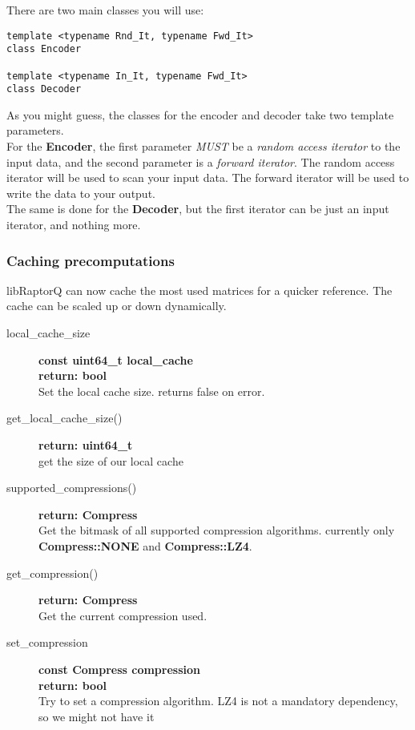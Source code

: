 \documentclass[11pt,a4paper]{refart}
\begin{document}
\newpage

There are two main classes you will use:
\begin{verbatim}
template <typename Rnd_It, typename Fwd_It>
class Encoder

template <typename In_It, typename Fwd_It>
class Decoder
\end{verbatim}

As you might guess, the classes for the encoder and decoder take two template parameters.\\
For the \textbf{Encoder}, the first parameter \textit{MUST} be a \textit{random access iterator} to the input data, and the second parameter is a
\textit{forward iterator}. The random access iterator will be used to scan your input data. The forward iterator will be used to write the data to your output.\\
The same is done for the \textbf{Decoder}, but the first iterator can be just an input iterator, 
and nothing more.

\subsubsection{Caching precomputations}
libRaptorQ can now cache the most used matrices for a quicker reference. The cache can be scaled up or down dynamically.

\begin{description}

\item[local\_cache\_size] \textbf{const uint64\_t local\_cache}\\
\textbf{return: bool}\\
Set the local cache size. returns false on error.

\item[get\_local\_cache\_size()] \textbf{return: uint64\_t}\\
get the size of our local cache

\item[supported\_compressions()] \textbf{return: Compress} \\
Get the bitmask of all supported compression algorithms. currently only \textbf{Compress::NONE} and \textbf{Compress::LZ4}.

\item[get\_compression()] \textbf{return: Compress} \\
Get the current compression used.

\item [set\_compression] \textbf{const Compress compression} \\
\textbf{return: bool}\\
Try to set a compression algorithm. LZ4 is not a mandatory dependency, so we might not have it

\end{description}
\end{document}
